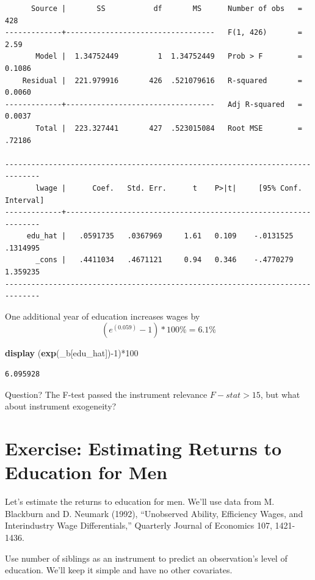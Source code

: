 \documentclass[
]{book}
\newenvironment{Shaded}{\begin{snugshade}}{\end{snugshade}}
\newcommand{\FunctionTok}[1]{\textcolor[rgb]{0.13,0.29,0.53}{\textbf{#1}}}
\newcommand{\KeywordTok}[1]{\textcolor[rgb]{0.13,0.29,0.53}{\textbf{#1}}}
\newcommand{\NormalTok}[1]{#1}
\begin{document}
\begin{verbatim}
      Source |       SS           df       MS      Number of obs   =       428
-------------+----------------------------------   F(1, 426)       =      2.59
       Model |  1.34752449         1  1.34752449   Prob > F        =    0.1086
    Residual |  221.979916       426  .521079616   R-squared       =    0.0060
-------------+----------------------------------   Adj R-squared   =    0.0037
       Total |  223.327441       427  .523015084   Root MSE        =    .72186

------------------------------------------------------------------------------
       lwage |      Coef.   Std. Err.      t    P>|t|     [95% Conf. Interval]
-------------+----------------------------------------------------------------
     edu_hat |   .0591735   .0367969     1.61   0.109    -.0131525    .1314995
       _cons |   .4411034   .4671121     0.94   0.346    -.4770279    1.359235
------------------------------------------------------------------------------
\end{verbatim}

One additional year of education increases wages by \[ (e^{(0.059)}-1)*100\%=6.1\% \]

\begin{Shaded}
\begin{Highlighting}[]
\KeywordTok{display}\NormalTok{ (}\FunctionTok{exp}\NormalTok{(\_b[edu\_hat]){-}1)*100}
\end{Highlighting}
\end{Shaded}

\begin{verbatim}
6.095928
\end{verbatim}

Question?
The F-test passed the instrument relevance \(F-stat > 15\), but what
about instrument exogeneity?

\section{Exercise: Estimating Returns to Education for Men}\label{exercise-estimating-returns-to-education-for-men}

Let's estimate the returns to education for men. We'll use data from M. Blackburn and D. Neumark (1992), ``Unobserved Ability, Efficiency Wages, and Interindustry Wage Differentials,'' Quarterly Journal of Economics 107, 1421-1436.

Use number of siblings as an instrument to predict an observation's level of education. We'll keep it simple and have no other covariates.
\end{document}
